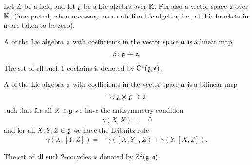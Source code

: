 
Let $\mathbb{K}$ be a field and let $\mathfrak{g}$ be a Lie algebra over $\mathbb{K}$.
Fix also a vector space $\mathfrak{a}$ over $\mathbb{K}$, (interpreted, when necessary,
as an abelian Lie algebra, i.e., all Lie brackets in $\mathfrak{a}$ are taken to
be zero).

\begin{definition}
  \label{def:LieOneCocycle}
  \leanok
  A  of the Lie algebra $\mathfrak{g}$ with coefficients in the vector
  space $\mathfrak{a}$ is a linear map
  \begin{align*}
    \beta \colon \mathfrak{g} \to \mathfrak{a} .
  \end{align*}
  The set of all such 1-cochains is denoted by $\mathrm{C}^1(\mathfrak{g}, \mathfrak{a})$.
\end{definition}

\begin{definition}
  \label{def:LieTwoCocycle}
  \leanok
  A  of the Lie algebra $\mathfrak{g}$ with coefficients in the vector
  space $\mathfrak{a}$ is a bilinear map
  \begin{align*}
    \gamma \colon \mathfrak{g} \times \mathfrak{g} \to \mathfrak{a}
  \end{align*}
  such that for all $X \in \mathfrak{g}$ we have the antisymmetry condition
  \begin{align}\label{eq:LieTwoCocycle.self}
    \gamma(X,X) = \; & 0
  \end{align}
  and for all $X,Y,Z \in \mathfrak{g}$ we have the Leibnitz rule
  \begin{align}\label{eq:LieTwoCocycle.leibniz}
    \gamma(X,[Y,Z]) = \; & \gamma([X,Y],Z) + \gamma(Y,[X,Z]) .
  \end{align}

  The set of all such 2-cocycles is denoted by $\mathrm{Z}^2(\mathfrak{g}, \mathfrak{a})$.
\end{definition}

